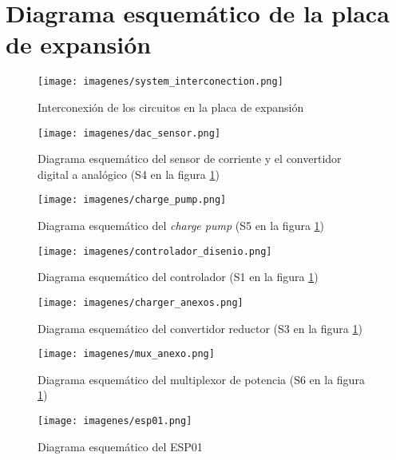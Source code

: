 \section{Diagrama esquemático de la placa de expansión}


\begin{figure}[H]
    \centering
    \texttt{[image: imagenes/system\_interconection.png]}
    \caption{Interconexión de los circuitos en la placa de expansión}
    \label{fig:all}    
\end{figure}

\begin{figure}[H]
    \centering
    \texttt{[image: imagenes/dac\_sensor.png]}
    \caption{Diagrama esquemático del sensor de corriente y el convertidor digital a analógico
    (S4 en la figura \ref{fig:all})}
    \label{fig:dac_sensor}
\end{figure}


\begin{figure}[H]
    \centering
    \texttt{[image: imagenes/charge\_pump.png]}
    \caption{Diagrama esquemático del \textit{charge pump} (S5 en la figura \ref{fig:all})}
    \label{fig:charge_pump_anexo}
\end{figure}


\begin{figure}[H]
    \centering
    \texttt{[image: imagenes/controlador\_disenio.png]}
    \caption{Diagrama esquemático del controlador (S1 en la figura \ref{fig:all})}
    \label{fig:controlador_anexo}
\end{figure}

\begin{figure}[H]
    \centering
    \texttt{[image: imagenes/charger\_anexos.png]}
    \caption{Diagrama esquemático del convertidor reductor (S3 en la figura \ref{fig:all})}
    \label{fig:charger_anexo}
\end{figure}

\begin{figure}[H]
    \centering
    \texttt{[image: imagenes/mux\_anexo.png]}
    \caption{Diagrama esquemático del multiplexor de potencia (S6 en la figura \ref{fig:all})}
    \label{fig:charger_anexo}  
\end{figure}

\begin{figure}[H]
    \centering
    \texttt{[image: imagenes/esp01.png]}
    \caption{Diagrama esquemático del ESP01}
    \label{fig:esp01_anexo}
\end{figure}

